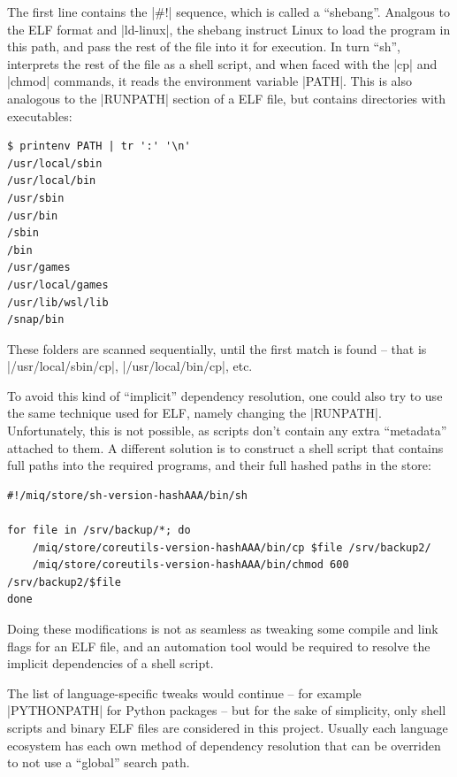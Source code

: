 The first line contains the |#!| sequence, which is called a
``shebang''. Analgous to the ELF format and |ld-linux|, the
shebang instruct Linux to load the program in this path, and
pass the rest of the file into it for execution. In turn
``sh'', interprets the rest of the file as a shell script,
and when faced with the |cp| and |chmod| commands, it reads
the environment variable |PATH|. This is also analogous to
the |RUNPATH| section of a ELF file, but contains
directories with executables:

\begin{verbatim}
$ printenv PATH | tr ':' '\n'
/usr/local/sbin
/usr/local/bin
/usr/sbin
/usr/bin
/sbin
/bin
/usr/games
/usr/local/games
/usr/lib/wsl/lib
/snap/bin
\end{verbatim}

These folders are scanned sequentially, until the first
match is found -- that is |/usr/local/sbin/cp|, |/usr/local/bin/cp|, etc.

To avoid this kind of ``implicit'' dependency resolution,
one could also try to use the same technique used for ELF,
namely changing the |RUNPATH|. Unfortunately, this is not
possible, as scripts don't contain any extra ``metadata''
attached to them. A different solution is to construct a
shell script that contains full paths into the required
programs, and their full hashed paths in the store:

\begin{verbatim}
#!/miq/store/sh-version-hashAAA/bin/sh

for file in /srv/backup/*; do
    /miq/store/coreutils-version-hashAAA/bin/cp $file /srv/backup2/
    /miq/store/coreutils-version-hashAAA/bin/chmod 600 /srv/backup2/$file
done
\end{verbatim}

Doing these modifications is not as seamless as tweaking some
compile and link flags for an ELF file, and an automation
tool would be required to resolve the implicit dependencies
of a shell script.

The list of language-specific tweaks would continue -- for
example |PYTHONPATH| for Python packages -- but for the sake
of simplicity, only shell scripts and binary ELF files are
considered in this project. Usually each language ecosystem
has each own method of dependency resolution that can be
overriden to not use a ``global'' search path.

